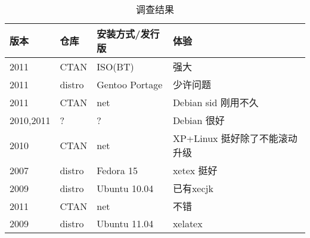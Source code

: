 \begin{table}[htbp]
	\centering
	\caption{调查结果}
	\begin{tabular}{lllp{6em}}
		\hline
版本		&仓库	&安装方式/发行版&体验\\
		\hline
2011		&CTAN	&ISO(BT)	&强大 \\
2011		&distro	&Gentoo Portage	&少许问题 \\
2011		&CTAN	&net		&Debian sid 刚用不久 \\
2010,2011	&?	&?		&Debian 很好 \\
2010		&CTAN	&net		&XP+Linux 挺好除了不能滚动升级 \\
2007		&distro	&Fedora 15	&xetex 挺好 \\
2009		&distro	&Ubuntu 10.04	&已有xecjk \\
2011		&CTAN	&net		&不错 \\
2009		&distro	&Ubuntu 11.04	&xelatex \\
		\hline
	\end{tabular}
	\label{tab:poll_result}
\end{table}

